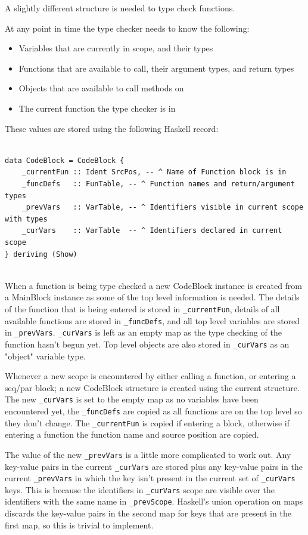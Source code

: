 A slightly different structure is needed to type check functions.

At any point in time the type checker needs to know the following:
\begin{itemize}
    \item Variables that are currently in scope, and their types
    \item Functions that are available to call, their argument types, and return types
    \item Objects that are available to call methods on
    \item The current function the type checker is in
\end{itemize}

These values are stored using the following Haskell record: 

\begin{lstlisting}[style=myHaskell]

data CodeBlock = CodeBlock {
    _currentFun :: Ident SrcPos, -- ^ Name of Function block is in
    _funcDefs   :: FunTable, -- ^ Function names and return/argument types
    _prevVars   :: VarTable, -- ^ Identifiers visible in current scope with types
    _curVars    :: VarTable  -- ^ Identifiers declared in current scope
} deriving (Show)


\end{lstlisting}

When a function is being type checked a new CodeBlock instance is
created from a MainBlock instance as some of the top level information is needed.
The details of the function that is being entered is stored in \texttt{\_currentFun}, 
details of all available functions are stored in \texttt{\_funcDefs}, and all top
level variables are stored in \texttt{\_prevVars}. \texttt{\_curVars} is left 
as an empty map as the type checking of the function hasn't begun yet. Top level objects are also
stored in \texttt{\_curVars} as an "object" variable type.

Whenever a new scope is encountered by either calling a function, or entering a seq/par block;
a new CodeBlock structure is created using the current structure. The new \texttt{\_curVars}
is set to the empty map as no variables have been encountered yet, the \texttt{\_funcDefs}
are copied as all functions are on the top level so they don't change. The \texttt{\_currentFun}
is copied if entering a block, otherwise if entering a function the function name
and source position are copied. 

The value of the new \texttt{\_prevVars} is a little more complicated to work out.
Any key-value pairs in the current \texttt{\_curVars} are stored plus any key-value pairs in the 
current \texttt{\_prevVars} in which the key isn't present in the current 
set of \texttt{\_curVars} keys. This is because
the identifiers in \texttt{\_curVars} scope are visible over the identifiers with
the same name in \texttt{\_prevScope}. Haskell's union operation on maps
discards the key-value pairs in the second map for keys that are
present in the first map, so this is trivial to implement.

